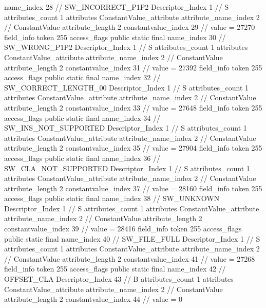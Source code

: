{{{{{				name_index	28		// SW_INCORRECT_P1P2
				Descriptor_Index	1		// S
				attributes_count	1
				attributes {
				ConstantValue_attribute {
					attribute_name_index	2		// ConstantValue
					attribute_length	2
					constantvalue_index	29		// value = 27270
				}
				}
			}
			field_info {
				token	255
				access_flags	public static final
				name_index	30		// SW_WRONG_P1P2
				Descriptor_Index	1		// S
				attributes_count	1
				attributes {
				ConstantValue_attribute {
					attribute_name_index	2		// ConstantValue
					attribute_length	2
					constantvalue_index	31		// value = 27392
				}
				}
			}
			field_info {
				token	255
				access_flags	public static final
				name_index	32		// SW_CORRECT_LENGTH_00
				Descriptor_Index	1		// S
				attributes_count	1
				attributes {
				ConstantValue_attribute {
					attribute_name_index	2		// ConstantValue
					attribute_length	2
					constantvalue_index	33		// value = 27648
				}
				}
			}
			field_info {
				token	255
				access_flags	public static final
				name_index	34		// SW_INS_NOT_SUPPORTED
				Descriptor_Index	1		// S
				attributes_count	1
				attributes {
				ConstantValue_attribute {
					attribute_name_index	2		// ConstantValue
					attribute_length	2
					constantvalue_index	35		// value = 27904
				}
				}
			}
			field_info {
				token	255
				access_flags	public static final
				name_index	36		// SW_CLA_NOT_SUPPORTED
				Descriptor_Index	1		// S
				attributes_count	1
				attributes {
				ConstantValue_attribute {
					attribute_name_index	2		// ConstantValue
					attribute_length	2
					constantvalue_index	37		// value = 28160
				}
				}
			}
			field_info {
				token	255
				access_flags	public static final
				name_index	38		// SW_UNKNOWN
				Descriptor_Index	1		// S
				attributes_count	1
				attributes {
				ConstantValue_attribute {
					attribute_name_index	2		// ConstantValue
					attribute_length	2
					constantvalue_index	39		// value = 28416
				}
				}
			}
			field_info {
				token	255
				access_flags	public static final
				name_index	40		// SW_FILE_FULL
				Descriptor_Index	1		// S
				attributes_count	1
				attributes {
				ConstantValue_attribute {
					attribute_name_index	2		// ConstantValue
					attribute_length	2
					constantvalue_index	41		// value = 27268
				}
				}
			}
			field_info {
				token	255
				access_flags	public static final
				name_index	42		// OFFSET_CLA
				Descriptor_Index	43		// B
				attributes_count	1
				attributes {
				ConstantValue_attribute {
					attribute_name_index	2		// ConstantValue
					attribute_length	2
					constantvalue_index	44		// value = 0
}}}}}}}
